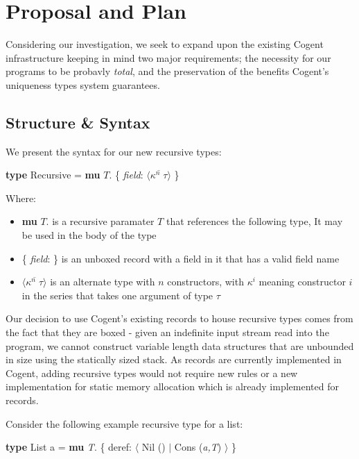 \chapter{Proposal and Plan}\label{ch:style}

Considering our investigation, we seek to expand upon the existing Cogent infrastructure keeping in mind
two major requirements; the necessity for our programs to be probavly \textit{total}, and the preservation 
of the benefits Cogent's uniqueness types system guarantees.



\section{Structure \& Syntax}

We present the syntax for our new recursive types:

\begin{center}
    \textbf{type} Recursive = \textbf{mu} $T$. \{ \textit{field}: $\langle \overline{\kappa^n\; \tau} \rangle$ \}
\end{center}

Where:
\begin{itemize}
    \item
        \textbf{mu} $T$. is a recursive paramater $T$ that references the following type,
        It may be used in the body of the type
    \item
        \{ \textit{field}: \} is an unboxed record with a field in it that has a valid field name
    \item 
        $\langle \overline{\kappa^n\; \tau} \rangle$ is an alternate type with $n$ constructors, 
        with $\kappa^i$ meaning constructor $i$ in the series that takes one argument of type $\tau$
\end{itemize}

Our decision to use Cogent's existing records to house recursive types comes from the fact that they are boxed -
given an indefinite input stream read into the program, we cannot construct variable length data structures that
are unbounded in size using the statically sized stack. As records are currently implemented in Cogent,
adding recursive types would not require new rules or a new implementation for static memory allocation which
is already implemented for records.

Consider the following example recursive type for a list:

\begin{center}
    \textbf{type} List a = \textbf{mu} \textit{T}. \{ deref: $\langle$ Nil () $\vert$ Cons (\textit{a,T}) $\rangle$ \}
\end{center}

